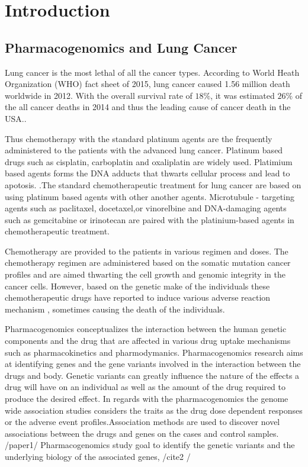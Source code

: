 
\chapter{Introduction}
\label{chapter: /Literature review on pharmacogenomics approaches, exome sequencing technolgy and variamt calling, Rare and common variant association tests, Quantitative and Qualitative association of the variants, Pathway based studies}

\section{Pharmacogenomics and Lung Cancer}
Lung cancer is the most lethal of all the cancer types. According to World Heath Organization (WHO) \cite{WHO} fact sheet of 2015, lung cancer caused 1.56 million death worldwide in 2012. With the overall survival rate of $18\% $, it was estimated $26\%$ of the all cancer deaths in 2014 and thus the leading cause of cancer death in the USA.\cite{siegel2014cancer}.

Thus chemotherapy with the standard platinum agents are the frequently administered to the patients with the advanced lung cancer.\cite{shiraishi2010association} Platinum based drugs such as  cisplatin, carboplatin and oxaliplatin are widely used. Platimium based agents forms the DNA adducts that thwarts cellular process and lead to apotosis. \cite {chen2013platinum}.The standard chemotherapeutic treatment for lung cancer are based on using platinum based agents with other another agents.\cite{goffin2010first} Microtubule - targeting agents such as paclitaxel, docetaxel,or vinorelbine and DNA-damaging agents such as gemcitabine or irinotecan are paired with the platinium-based agents in chemotherapeutic treatment.\cite{shiraishi2010association} 

Chemotherapy are provided to the patients in various regimen and doses. The chemotherapy regimen are administered based on the somatic  mutation cancer profiles and are aimed thwarting the cell growth and genomic integrity in the cancer cells. However, based on the genetic make of the individuals these chemotherapeutic drugs have reported to induce various adverse reaction mechanism , sometimes causing the death of the individuals.  

Pharmacogenomics conceptualizes the interaction between the human genetic components and the drug that are affected in various drug uptake mechanisms such as pharmacokinetics and pharmodymanics. Pharmacogenomics research aims at identifying genes and the gene variants involved in the interaction between the drugs and body. Genetic variants can greatly influence the nature of the effects a drug will  have on an individual as well as the amount of the drug required to produce the desired effect. In regards with the pharmacogenomics the genome wide association studies considers the traits as the drug dose dependent responses or the adverse event profiles.Association methods are used to discover novel associations between the drugs and genes on the cases and control samples. /paper1/ Pharmacogenomics study goal to identify the genetic variants and the underlying biology of the associated genes, /cite2 /

